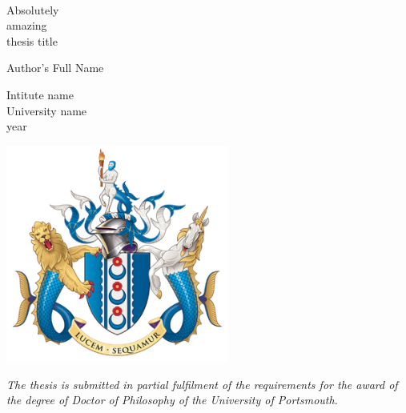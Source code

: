 \thispagestyle{empty}

{
\centering
\Large

~\vspace{2.6cm}

{\Huge 
Absolutely \\
amazing \\
thesis title \\
}

\vspace{2.2cm}

{\huge
Author's Full Name
}

\vspace{0.25cm}

{\Large
Intitute name\\
University name\\
year
}

\vspace{0.9cm}

\centering
\includegraphics[width=0.55\textwidth]{plots/University_of_Portsmouth_coat_of_arms.png}

\vspace{0.9cm}

\textit{The thesis is submitted in partial fulfilment of the requirements for the award of the degree of Doctor of Philosophy of the University of Portsmouth.}

\vspace{\fill}
}
